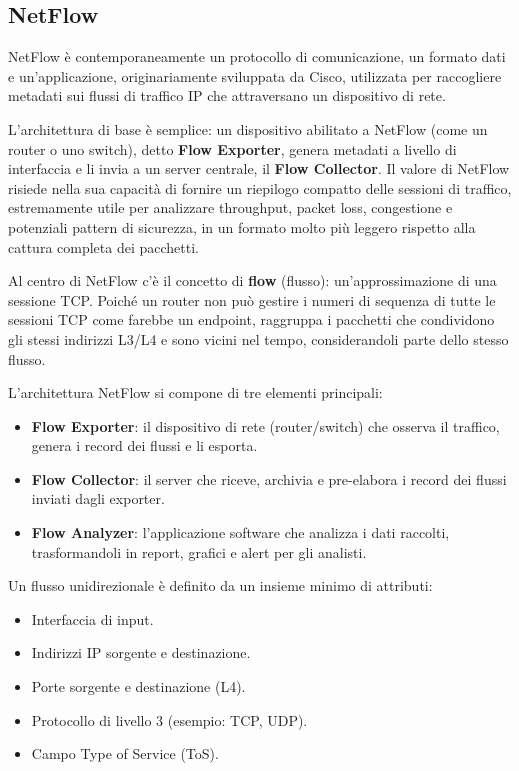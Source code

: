 \subsection{NetFlow}

NetFlow è contemporaneamente un protocollo di comunicazione, un formato dati
e un'applicazione, originariamente sviluppata da Cisco, utilizzata per raccogliere
metadati sui flussi di traffico IP che attraversano un dispositivo di rete.

L'architettura di base è semplice: un dispositivo abilitato a NetFlow
(come un router o uno switch), detto \textbf{Flow Exporter}, genera metadati
a livello di interfaccia e li invia a un server centrale, il \textbf{Flow Collector}.
Il valore di NetFlow risiede nella sua capacità di fornire un riepilogo compatto
delle sessioni di traffico, estremamente utile per analizzare throughput,
packet loss, congestione e potenziali pattern di sicurezza, in un formato
molto più leggero rispetto alla cattura completa dei pacchetti.

Al centro di NetFlow c'è il concetto di \textbf{flow} (flusso): un'approssimazione
di una sessione TCP. Poiché un router non può gestire i numeri di sequenza di
tutte le sessioni TCP come farebbe un endpoint, raggruppa i pacchetti che
condividono gli stessi indirizzi L3/L4 e sono vicini nel tempo, considerandoli
parte dello stesso flusso.

L'architettura NetFlow si compone di tre elementi principali:

\begin{itemize}
\item \textbf{Flow Exporter}: il dispositivo di rete (router/switch) che osserva
il traffico, genera i record dei flussi e li esporta.
\item \textbf{Flow Collector}: il server che riceve, archivia e pre-elabora
i record dei flussi inviati dagli exporter.
\item \textbf{Flow Analyzer}: l'applicazione software che analizza i dati
raccolti, trasformandoli in report, grafici e alert per gli analisti.
\end{itemize}

Un flusso unidirezionale è definito da un insieme minimo di attributi:
\begin{itemize}
\item Interfaccia di input.
\item Indirizzi IP sorgente e destinazione.
\item Porte sorgente e destinazione (L4).
\item Protocollo di livello 3 (esempio: TCP, UDP).
\item Campo Type of Service (ToS).
\end{itemize}

